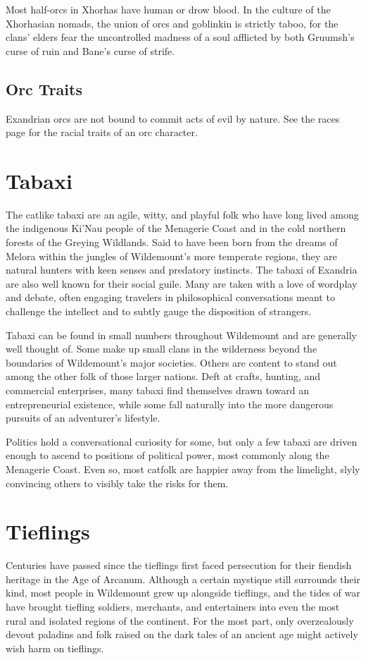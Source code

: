 \documentclass[10pt,a4paper,twoside,bg=print,twocolumn,openany,nodeprecatedcode]{dndbook}
\begin{document}
Most half-orcs in Xhorhas have human or drow blood. In the culture of the Xhorhasian nomads, the union of orcs and goblinkin is strictly taboo, for the clans' elders fear the uncontrolled madness of a soul afflicted by both Gruumsh's curse of ruin and Bane's curse of strife.

\subsection{Orc Traits}
Exandrian orcs are not bound to commit acts of evil by nature. See the races page for the racial traits of an orc character.

\section{Tabaxi}
The catlike tabaxi are an agile, witty, and playful folk who have long lived among the indigenous Ki'Nau people of the Menagerie Coast and in the cold northern forests of the Greying Wildlands. Said to have been born from the dreams of Melora within the jungles of Wildemount's more temperate regions, they are natural hunters with keen senses and predatory instincts. The tabaxi of Exandria are also well known for their social guile. Many are taken with a love of wordplay and debate, often engaging travelers in philosophical conversations meant to challenge the intellect and to subtly gauge the disposition of strangers.

Tabaxi can be found in small numbers throughout Wildemount and are generally well thought of. Some make up small clans in the wilderness beyond the boundaries of Wildemount's major societies. Others are content to stand out among the other folk of those larger nations. Deft at crafts, hunting, and commercial enterprises, many tabaxi find themselves drawn toward an entrepreneurial existence, while some fall naturally into the more dangerous pursuits of an adventurer's lifestyle.

Politics hold a conversational curiosity for some, but only a few tabaxi are driven enough to ascend to positions of political power, most commonly along the Menagerie Coast. Even so, most catfolk are happier away from the limelight, slyly convincing others to visibly take the risks for them.

\section{Tieflings}
Centuries have passed since the tieflings first faced persecution for their fiendish heritage in the Age of Arcanum. Although a certain mystique still surrounds their kind, most people in Wildemount grew up alongside tieflings, and the tides of war have brought tiefling soldiers, merchants, and entertainers into even the most rural and isolated regions of the continent. For the most part, only overzealously devout paladins and folk raised on the dark tales of an ancient age might actively wish harm on tieflings.
\end{document}
